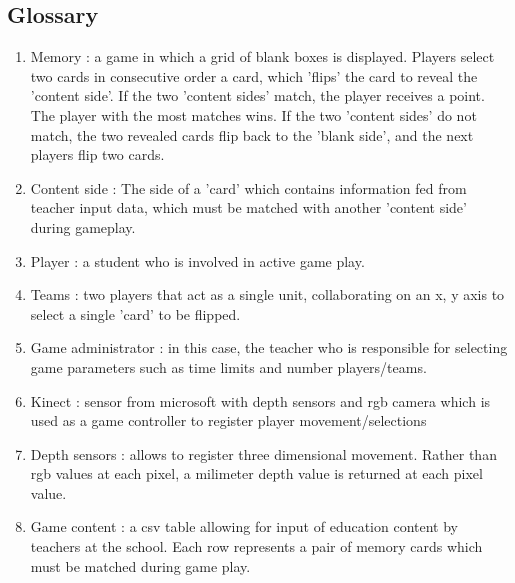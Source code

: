 \subsection{Glossary}

\begin{enumerate}
	\item Memory : a game in which a grid of blank boxes is displayed. Players select two cards in consecutive order a card, which 'flips' the card to reveal the 'content side'. If the two 'content sides' match, the player receives a point. The player with the most matches wins. If the two 'content sides' do not match, the two revealed cards flip back to the 'blank side', and the next players flip two cards.
	\item Content side : The side of a 'card' which contains information fed from teacher input data, which must be matched with another 'content side' during gameplay.
	\item Player : a student who is involved in active game play.
	\item Teams : two players that act as a single unit, collaborating on an x, y axis to select a single 'card' to be flipped.
	\item Game administrator : in this case, the teacher who is responsible for selecting game parameters such as time limits and number players/teams.
	\item Kinect : sensor from microsoft with depth sensors and rgb camera which is used as a game controller to register player movement/selections
	\item Depth sensors : allows to register three dimensional movement. Rather than rgb values at each pixel, a milimeter depth value is returned at each pixel value.
	\item Game content : a csv table allowing for input of education content by teachers at the school. Each row represents a pair of memory cards which must be matched during game play.
\end{enumerate}